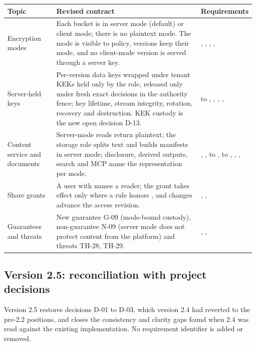 \begin{longtable}{@{}P{0.23\textwidth}P{0.48\textwidth}P{0.19\textwidth}@{}}
\toprule Topic & Revised contract & Requirements\\\midrule\endhead
Encryption modes & Each bucket is in server mode (default) or client mode; there is no plaintext mode. The mode is visible to policy, versions keep their mode, and no client-mode version is served through a server key. & , , , , \\
Server-held keys & Per-version data keys wrapped under tenant KEKs held only by the  role, released only under fresh exact decisions in the authority fence; key lifetime, stream integrity, rotation, recovery and destruction. KEK custody is the new open decision D-13. &  to , , , , \\
Content service and documents & Server-mode reads return plaintext; the storage role splits text and builds manifests in server mode; disclosure, derived outputs, search and MCP name the representation per mode. & , ,  to ,  to , , , \\
Share grants & A user with  names a reader; the grant takes effect only where a rule honors , and changes advance the access revision. & , , \\
Guarantees and threats & New guarantee G-09 (mode-bound custody), non-guarantee N-09 (server mode does not protect content from the platform) and threats TH-28, TH-29. & , , \\
\bottomrule
\end{longtable}

\subsection{Version 2.5: reconciliation with project decisions}
Version 2.5 restores decisions D-01 to D-03, which version 2.4 had reverted to the pre-2.2 positions, and closes the consistency and clarity gaps found when 2.4 was read against the existing implementation. No requirement identifier is added or removed.

